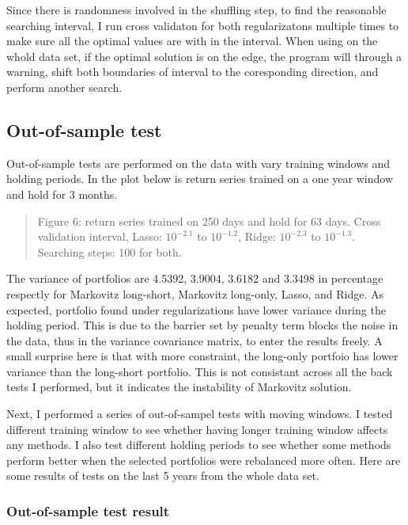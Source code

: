 \documentclass{article}
\newcommand{\ciapdf}[1]{\vspace*{-\parskip}\begin{center}\resizebox{0.75\textwidth}{!}{\texttt{[image: \#1]}}\end{center}}
\begin{document}
Since there is randomness involved in the shuffling step, to find the reasonable
searching interval, I run cross validaton for both regularizatons multiple times
to make sure all the optimal values are with in the interval. When using on
the whold data set, if the optimal solution is on the edge, the program will
through a warning, shift both boundaries of interval to the coresponding
direction, and perform another search.

\subsection*{Out-of-sample test}

Out-of-sample tests are performed on the data with vary training windows and
holding periods. In the plot below is return series trained on a one year
window and hold for 3 months.


\ciapdf{Figure_6T2.pdf}

\begin{quote}
Figure 6: return series trained on 250 days and hold for 63 days. Cross validation
interval, Lasso: $10^{-2.1}$ to $10^{-1.2}$, Ridge: $10^{-2.3}$ to $10^{-1.3}$.
Searching steps: 100 for both.
\end{quote}

The variance of portfolios are 4.5392, 3.9004, 3.6182 and 3.3498 in percentage
respectly
for Markovitz long-short, Markovitz long-only, Lasso, and Ridge. As expected,
portfolio found under regularizations have lower variance during the holding
period. This is due to the barrier set by penalty term blocks the noise in the
data, thus in the variance covariance matrix, to enter the results freely. A
small surprise here is that with more constraint, the long-only portfoio
has lower variance than the long-short portfolio. This is not consistant across
all the back tests I performed, but it indicates the instability of Markovitz
solution.

Next, I performed a series of out-of-sampel tests with moving windows. I tested
different training window to see whether having longer training window affects
any methods. I also test different holding periods to see whether some methods
perform better when the selected portfolios were rebalanced more often. Here are
some results of tests on the last 5 years from the whole data set.


\subsubsection*{\centering{}Out-of-sample test result}
\end{document}
